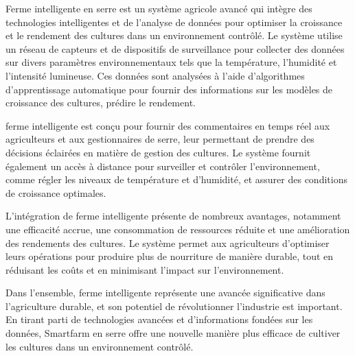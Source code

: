 \begin{abstractFr}
	
	Ferme intelligente en serre est un système agricole avancé qui intègre des technologies intelligentes et de l'analyse de données pour optimiser la croissance et le rendement des cultures dans un environnement contrôlé. Le système utilise un réseau de capteurs et de dispositifs de surveillance pour collecter des données sur divers paramètres environnementaux tels que la température, l'humidité et l'intensité lumineuse. Ces données sont analysées à l'aide d'algorithmes d'apprentissage automatique pour fournir des informations sur les modèles de croissance des cultures, prédire le rendement.

	ferme intelligente  est conçu pour fournir des commentaires en temps réel aux agriculteurs et aux gestionnaires de serre, leur permettant de prendre des décisions éclairées en matière de gestion des cultures. Le système fournit également un accès à distance pour surveiller et contrôler l'environnement, comme régler les niveaux de température et d'humidité, et assurer des conditions de croissance optimales.

L'intégration de ferme intelligente  présente de nombreux avantages, notamment une efficacité accrue, une consommation de ressources réduite et une amélioration des rendements des cultures. Le système permet aux agriculteurs d'optimiser leurs opérations pour produire plus de nourriture de manière durable, tout en réduisant les coûts et en minimisant l'impact sur l'environnement.

Dans l'ensemble, ferme intelligente  représente une avancée significative dans l'agriculture durable, et son potentiel de révolutionner l'industrie est important. En tirant parti de technologies avancées et d'informations fondées sur les données, Smartfarm en serre offre une nouvelle manière plus efficace de cultiver les cultures dans un environnement contrôlé.
	
\end{abstractFr}

